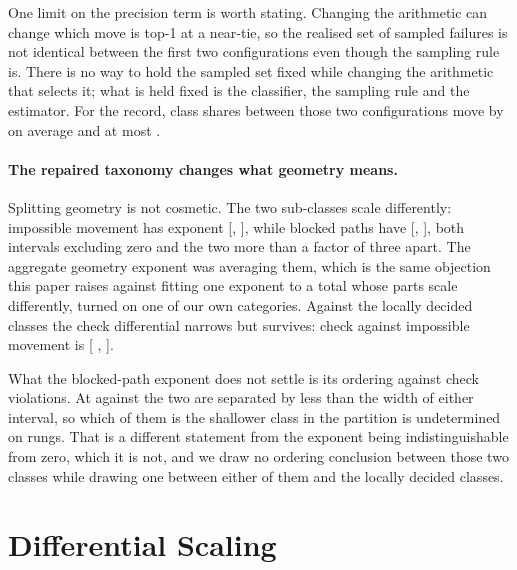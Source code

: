 \documentclass[11pt]{article}
\begin{document}
One limit on the precision term is worth stating. Changing the arithmetic can change
which move is top-1 at a near-tie, so the realised set of sampled failures is not
identical between the first two configurations even though the sampling rule is.
There is no way to hold the sampled set fixed while changing the arithmetic that
selects it; what is held fixed is the classifier, the sampling rule and the estimator.
For the record, class shares between those two configurations move by 
on average and at most .

\paragraph{The repaired taxonomy changes what geometry means.}
Splitting geometry is not cosmetic. The two sub-classes scale differently: impossible
movement has exponent  [, ], while blocked
paths have  [, ], both intervals
excluding zero and the two more than a factor of three apart. The aggregate geometry
exponent was averaging them, which is the same objection this paper raises against
fitting one exponent to a total whose parts scale differently, turned on one of our
own categories. Against the locally decided classes the check differential narrows
but survives: check against impossible movement is  [
, ].

What the blocked-path exponent does not settle is its ordering against check
violations. At  against  the two are separated by less than the
width of either interval, so which of them is the shallower class in the partition is
undetermined on  rungs. That is a different statement from the exponent being
indistinguishable from zero, which it is not, and we draw no ordering conclusion
between those two classes while drawing one between either of them and the locally
decided classes.

\section{Differential Scaling}
\label{sec:scaling}
\end{document}
